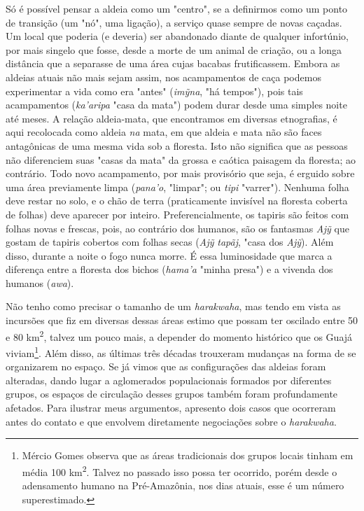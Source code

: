 Só é possível pensar a aldeia como um "centro", se a definirmos como um
ponto de transição (um "nó", uma ligação), a serviço quase sempre de
novas caçadas. Um local que poderia (e deveria) ser abandonado diante de
qualquer infortúnio, por mais singelo que fosse, desde a morte de um
animal de criação, ou a longa distância que a separasse de uma área
cujas bacabas frutificassem. Embora as aldeias atuais não mais sejam
assim, nos acampamentos de caça podemos experimentar a vida como era
"antes" (\emph{imỹna}, "há tempos"), pois tais acampamentos
(\emph{ka'aripa} "casa da mata") podem durar desde uma simples noite até
meses. A relação aldeia-mata, que encontramos em diversas etnografias, é
aqui recolocada como aldeia \emph{na} mata, em que aldeia e mata não são
faces antagônicas de uma mesma vida sob a floresta. Isto não significa
que as pessoas não diferenciem suas "casas da mata" da grossa e caótica
paisagem da floresta; ao contrário. Todo novo acampamento, por mais
provisório que seja, é erguido sobre uma área previamente limpa
(\emph{pana'o}, "limpar"; ou \emph{tipi} "varrer"). Nenhuma folha deve
restar no solo, e o chão de terra (praticamente invisível na floresta
coberta de folhas) deve aparecer por inteiro. Preferencialmente, os
tapiris são feitos com folhas novas e frescas, pois, ao contrário dos
humanos, são os fantasmas \emph{Ajỹ} que gostam de tapiris cobertos com
folhas secas (\emph{Ajỹ} \emph{tapãj}, "casa dos \emph{Ajỹ}). Além
disso, durante a noite o fogo nunca morre. É essa luminosidade que marca
a diferença entre a floresta dos bichos (\emph{hama'a} "minha presa") e
a vivenda dos humanos (\emph{awa}).

Não tenho como precisar o tamanho de um \emph{harakwaha}, mas tendo em
vista as incursões que fiz em diversas dessas áreas estimo que possam
ter oscilado entre 50 e 80 km\textsuperscript{2}, talvez um pouco mais,
a depender do momento histórico que os Guajá viviam\footnote{Mércio
  Gomes observa que as áreas tradicionais dos grupos locais tinham em
  média 100 km\textsuperscript{2}. Talvez no passado isso possa ter
  ocorrido, porém desde o adensamento humano na Pré-Amazônia, nos dias
  atuais, esse é um número superestimado.}. Além disso, as últimas três
décadas trouxeram mudanças na forma de se organizarem no espaço. Se já
vimos que as configurações das aldeias foram alteradas, dando lugar a
aglomerados populacionais formados por diferentes grupos, os espaços de
circulação desses grupos também foram profundamente afetados. Para
ilustrar meus argumentos, apresento dois casos que ocorreram antes do
contato e que envolvem diretamente negociações sobre o \emph{harakwaha}.

